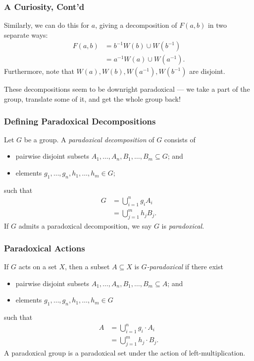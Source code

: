\documentclass{beamer-custom}
\begin{document}
\begin{frame}
  \frametitle{A Curiosity, Cont'd}
  Similarly, we can do this for $a$, giving a decomposition of $F(a,b)$ in two separate ways:
  \begin{align*}
    F(a,b) &= b^{-1}W(b)\cup W\left( b^{-1} \right)\\
           &= a^{-1}W(a)\cup W\left( a^{-1} \right).
  \end{align*}\pause
  Furthermore, note that $W\left( a \right),W\left( b \right),W\left( a^{-1} \right),W\left( b^{-1} \right)$ are disjoint.\pause\newline

  These decompositions seem to be downright paradoxical --- we take a part of the group, translate some of it, and get the whole group back!
\end{frame}
\begin{frame}
  \frametitle{Defining Paradoxical Decompositions}
  Let $G$ be a group. A \textit{paradoxical decomposition} of $G$ consists of
  \begin{itemize}
    \item pairwise disjoint subsets $A_1,\dots,A_n,B_1,\dots,B_m\subseteq G$; and
    \item elements $g_1,\dots,g_n,h_1,\dots,h_m\in G$;
  \end{itemize}
  such that
  \begin{align*}
    G &= \bigcup_{i=1}^{n}g_iA_i\\
      &= \bigcup_{j=1}^{m}h_jB_j.
  \end{align*}\pause
  If $G$ admits a paradoxical decomposition, we say $G$ is \textit{paradoxical}.
\end{frame}
\begin{frame}
  \frametitle{Paradoxical Actions}
  If $G$ acts on a set $X$, then a subset $A\subseteq X$ is \textit{$G$-paradoxical} if there exist
  \begin{itemize}
    \item pairwise disjoint subsets $A_1,\dots,A_n,B_1,\dots,B_m\subseteq A$; and
    \item elements $g_1,\dots,g_n,h_1,\dots,h_m\in G$
  \end{itemize}
  such that
  \begin{align*}
    A &= \bigcup_{i=1}^{n}g_i\cdot A_i\\
      &= \bigcup_{j=1}^{m}h_j\cdot B_j.
  \end{align*}\pause
  A paradoxical group is a paradoxical set under the action of left-multiplication.
\end{frame}
\end{document}
